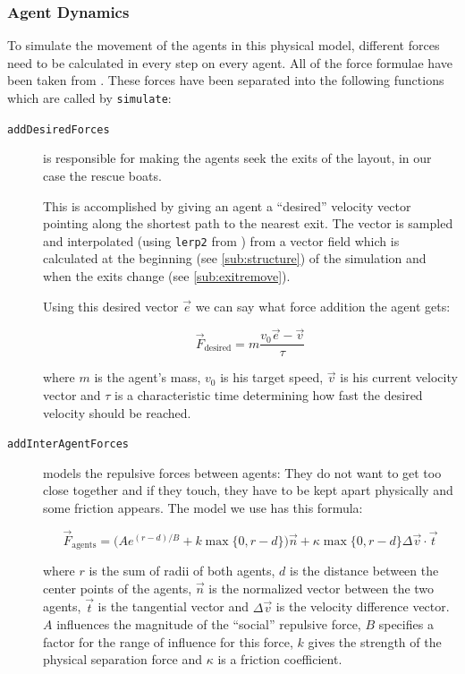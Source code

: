 \documentclass[11pt]{article}
\begin{document}
\subsubsection{Agent Dynamics}
\label{sub:movement}

To simulate the movement of the agents in this physical model, different forces
need to be calculated in every step on every agent.  All of the force formulae
have been taken from \cite{helbing}.  These forces have been separated into the
following functions which are called by \texttt{simulate}:

\begin{description}

\item[\texttt{addDesiredForces}] is responsible for making the agents seek the
exits of the layout, in our case the rescue boats.

This is accomplished by giving an agent a ``desired'' velocity vector pointing
along the shortest path to the nearest exit.  The vector is sampled and
interpolated (using \texttt{lerp2} from \cite{multilevel}) from a vector field
which is calculated at the beginning (see \ref{sub:structure}) of the
simulation and when the exits change (see \ref{sub:exitremove}).

Using this desired vector $\vec{e}$ we can say what force addition the agent gets:

\[ \vec{F}_\text{desired} = m \frac{v_0 \vec{e} - \vec{v}}{\tau} \]

where $m$ is the agent's mass, $v_0$ is his target speed, $\vec{v}$ is
his current velocity vector and $\tau$ is a characteristic time determining how
fast the desired velocity should be reached.

\item[\texttt{addInterAgentForces}] models the repulsive forces between agents:
They do not want to get too close together and if they touch, they have to be
kept apart physically and some friction appears.  The model we use has this
formula:

\[ \vec{F}_\text{agents} = \big(A e^{(r-d)/B} + k \max\{0, r-d\}\big) \vec{n} +
                     \kappa \max\{0, r-d\} \Delta \vec{v} \cdot \vec{t} \]

where $r$ is the sum of radii of both agents, $d$ is the distance between the
center points of the agents, $\vec{n}$ is the normalized vector between the two
agents, $\vec{t}$ is the tangential vector and $\Delta \vec{v}$ is the velocity
difference vector.  $A$ influences the magnitude of the ``social'' repulsive
force, $B$ specifies a factor for the range of influence for this force, $k$
gives the strength of the physical separation force and $\kappa$ is a friction
coefficient.


\end{description}
\end{document}
